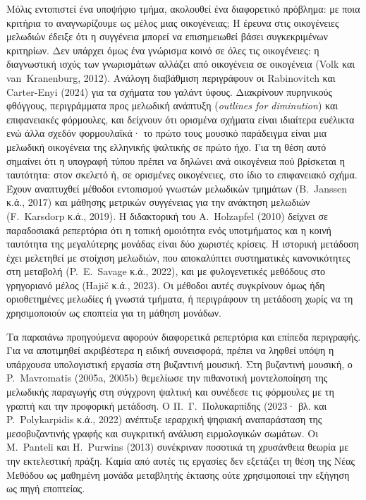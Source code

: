 \documentclass[11pt,a4paper]{article}
\begin{document}
Μόλις εντοπιστεί ένα υποψήφιο τμήμα, ακολουθεί ένα διαφορετικό πρόβλημα: με ποια κριτήρια το αναγνωρίζουμε ως μέλος μιας οικογένειας; Η έρευνα στις οικογένειες μελωδιών έδειξε ότι η συγγένεια μπορεί να επισημειωθεί βάσει συγκεκριμένων κριτηρίων. Δεν υπάρχει όμως ένα γνώρισμα κοινό σε όλες τις οικογένειες: η διαγνωστική ισχύς των γνωρισμάτων αλλάζει από οικογένεια σε οικογένεια (Volk και van~Kranenburg, 2012). Ανάλογη διαβάθμιση περιγράφουν οι Rabinovitch και Carter-Enyi (2024) για τα σχήματα του γαλάντ ύφους. Διακρίνουν πυρηνικούς φθόγγους, περιγράμματα προς μελωδική ανάπτυξη (\emph{outlines for diminution}) και επιφανειακές φόρμουλες, και δείχνουν ότι ορισμένα σχήματα είναι ιδιαίτερα ευέλικτα ενώ άλλα σχεδόν φορμουλαϊκά· το πρώτο τους μουσικό παράδειγμα είναι μια μελωδική οικογένεια της ελληνικής ψαλτικής σε πρώτο ήχο. Για τη θέση αυτό σημαίνει ότι η υπογραφή τύπου πρέπει να δηλώνει ανά οικογένεια πού βρίσκεται η ταυτότητα: στον σκελετό ή, σε ορισμένες οικογένειες, στο ίδιο το επιφανειακό σχήμα. Έχουν αναπτυχθεί μέθοδοι εντοπισμού γνωστών μελωδικών τμημάτων (B.~Janssen κ.ά., 2017) και μάθησης μετρικών συγγένειας για την ανάκτηση μελωδιών (F.~Karsdorp κ.ά., 2019). Η διδακτορική του A.~Holzapfel (2010) δείχνει σε παραδοσιακά ρεπερτόρια ότι η τοπική ομοιότητα ενός υποτμήματος και η κοινή ταυτότητα της μεγαλύτερης μονάδας είναι δύο χωριστές κρίσεις. Η ιστορική μετάδοση έχει μελετηθεί με στοίχιση μελωδιών, που αποκαλύπτει συστηματικές κανονικότητες στη μεταβολή (P.~E.~Savage κ.ά., 2022), και με φυλογενετικές μεθόδους στο γρηγοριανό μέλος (Hajič κ.ά., 2023). Οι μέθοδοι αυτές συγκρίνουν όμως ήδη οριοθετημένες μελωδίες ή γνωστά τμήματα, ή περιγράφουν τη μετάδοση χωρίς να τη χρησιμοποιούν ως εποπτεία για τη μάθηση μονάδων.

Τα παραπάνω προηγούμενα αφορούν διαφορετικά ρεπερτόρια και επίπεδα περιγραφής. Για να αποτιμηθεί ακριβέστερα η ειδική συνεισφορά, πρέπει να ληφθεί υπόψη η υπάρχουσα υπολογιστική εργασία στη βυζαντινή μουσική. Στη βυζαντινή μουσική, ο P.~Mavromatis (2005a, 2005b) θεμελίωσε την πιθανοτική μοντελοποίηση της μελωδικής παραγωγής στη σύγχρονη ψαλτική και συνέδεσε τις φόρμουλες με τη γραπτή και την προφορική μετάδοση. Ο Π.~Γ.~Πολυκαρπίδης (2023· βλ. και P.~Polykarpidis κ.ά., 2022) ανέπτυξε ιεραρχική ψηφιακή αναπαράσταση της μεσοβυζαντινής γραφής και συγκριτική ανάλυση ειρμολογικών σωμάτων. Οι M.~Panteli και H.~Purwins (2013) συνέκριναν ποσοτικά τη χρυσάνθεια θεωρία με την εκτελεστική πράξη. Καμία από αυτές τις εργασίες δεν εξετάζει τη θέση της Νέας Μεθόδου ως μαθημένη μονάδα μεταβλητής έκτασης ούτε χρησιμοποιεί την εξήγηση ως πηγή εποπτείας.
\end{document}
